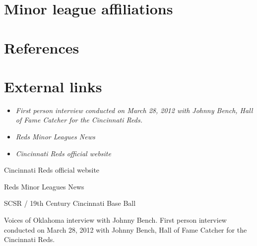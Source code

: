 \section{Minor league affiliations}\label{minor-league-affiliations}

\section{References}\label{references}

\section{External links}\label{external-links}

\begin{itemize}
\item
  \emph{First person interview conducted on March 28, 2012 with Johnny
  Bench, Hall of Fame Catcher for the Cincinnati Reds.}
\item
  \emph{Reds Minor Leagues News}
\item
  \emph{Cincinnati Reds official website}
\end{itemize}

Cincinnati Reds official website

Reds Minor Leagues News

SCSR / 19th Century Cincinnati Base Ball

Voices of Oklahoma interview with Johnny Bench. First person interview
conducted on March 28, 2012 with Johnny Bench, Hall of Fame Catcher for
the Cincinnati Reds.
